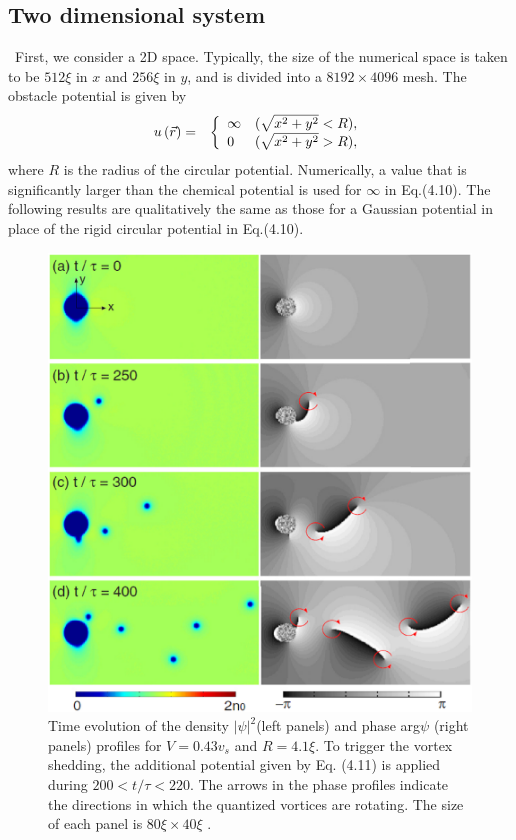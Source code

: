\documentclass[12pt,a4paper]{report}
\begin{document}
\subsection{Two dimensional system}
\ First, we consider a 2D space. Typically, the size of
the numerical space is taken to be $512 \xi$ in $x$ and $256 \xi$ in
$y$, and is divided into a $8192 \times 4096$ mesh. The obstacle
potential is given by
\begin{eqnarray}
u \left( \vec{r} \right) & = &
\left \{
\begin{array}{l l}
\infty & ( \sqrt{x^2+y^2} < R ),
\\
     0 & ( \sqrt{x^2+y^2} > R ),
\end{array}
\right.
\end{eqnarray}
where $R$ is the radius of the circular potential.
Numerically, a value that is significantly larger than the chemical
potential is used for $\infty$ in Eq.(4.10). The following results
are qualitatively the same as those for a Gaussian potential in place
of the rigid circular potential in Eq.(4.10).
\\
\begin{figure}[htbp]
\begin{center}
\includegraphics[scale=0.40, keepaspectratio]{4-1.eps}
\caption{
Time evolution of the density $|\psi|^2$(left
panels) and phase arg$\psi$ (right panels) profiles for $V = 0.43 v_s$ and
$R=4.1 \xi$. To trigger the vortex shedding, the additional potential
given by Eq. (4.11) is applied during $200 < t/\tau < 220$. The arrows
in the phase profiles indicate the directions in which the quantized
vortices are rotating. The size of each panel is $80 \xi \times 40 \xi$ .
}
\label{FIG:4-1}
\end{center}
\end{figure}
\end{document}
